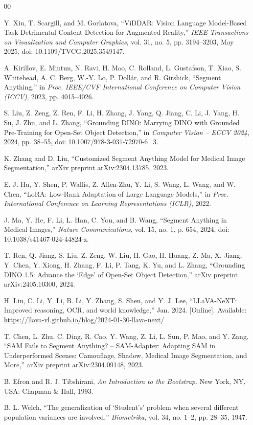 \documentclass[conference]{IEEEtran}
\begin{document}

\begin{thebibliography}{00}

Y. Xiu, T. Scargill, and M. Gorlatova,
``ViDDAR: Vision Language Model-Based Task-Detrimental Content Detection for Augmented Reality,''
\emph{IEEE Transactions on Visualization and Computer Graphics},
vol. 31, no. 5, pp. 3194--3203, May 2025,
doi: 10.1109/TVCG.2025.3549147.

A. Kirillov, E. Mintun, N. Ravi, H. Mao, C. Rolland,
L. Gustafson, T. Xiao, S. Whitehead, A. C. Berg,
W.-Y. Lo, P. Dollár, and R. Girshick,
``Segment Anything,''
in \emph{Proc. IEEE/CVF International Conference on Computer Vision (ICCV)},
2023, pp. 4015--4026.

S. Liu, Z. Zeng, Z. Ren, F. Li, H. Zhang, J. Yang,
Q. Jiang, C. Li, J. Yang, H. Su, J. Zhu, and L. Zhang,
``Grounding DINO: Marrying DINO with Grounded Pre-Training for
Open-Set Object Detection,''
in \emph{Computer Vision -- ECCV 2024},
2024, pp. 38--55,
doi: 10.1007/978-3-031-72970-6\_3.

K. Zhang and D. Liu,
``Customized Segment Anything Model for Medical Image Segmentation,''
arXiv preprint arXiv:2304.13785, 2023.

E. J. Hu, Y. Shen, P. Wallis, Z. Allen-Zhu, Y. Li,
S. Wang, L. Wang, and W. Chen,
``LoRA: Low-Rank Adaptation of Large Language Models,''
in \emph{Proc. International Conference on Learning Representations (ICLR)},
2022.

J. Ma, Y. He, F. Li, L. Han, C. You, and B. Wang,
``Segment Anything in Medical Images,''
\emph{Nature Communications}, vol. 15, no. 1, p. 654, 2024,
doi: 10.1038/s41467-024-44824-z.

T. Ren, Q. Jiang, S. Liu, Z. Zeng, W. Liu, H. Gao, H. Huang, Z. Ma, X. Jiang, Y. Chen, Y. Xiong, H. Zhang, F. Li, P. Tang, K. Yu, and L. Zhang,
``Grounding DINO 1.5: Advance the `Edge' of Open-Set Object Detection,''
arXiv preprint arXiv:2405.10300, 2024.

H. Liu, C. Li, Y. Li, B. Li, Y. Zhang, S. Shen, and Y. J. Lee,
``LLaVA-NeXT: Improved reasoning, OCR, and world knowledge,''
Jan. 2024. [Online]. Available: \url{https://llava-vl.github.io/blog/2024-01-30-llava-next/}

T. Chen, L. Zhu, C. Ding, R. Cao, Y. Wang, Z. Li, L. Sun, P. Mao, and Y. Zang,
``SAM Fails to Segment Anything? -- SAM-Adapter: Adapting SAM in Underperformed Scenes: Camouflage, Shadow, Medical Image Segmentation, and More,''
arXiv preprint arXiv:2304.09148, 2023.

B. Efron and R. J. Tibshirani,
\emph{An Introduction to the Bootstrap}.
New York, NY, USA: Chapman \& Hall, 1993.

B. L. Welch,
``The generalization of `Student's' problem when several different population variances are involved,''
\emph{Biometrika}, vol. 34, no. 1--2, pp. 28--35, 1947.

\end{thebibliography}
\end{document}
